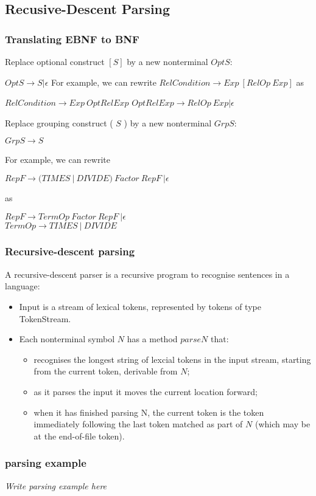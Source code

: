 \subsection{Recusive-Descent Parsing}
\subsubsection{Translating EBNF to BNF}

Replace optional construct $[S]$ by a new nonterminal $OptS$:

$OptS \rightarrow S | \epsilon$ \newline
For example, we can rewrite
$RelCondition \rightarrow Exp \ [RelOp \ Exp]$ \newline
as

$RelCondition \rightarrow Exp \ OptRelExp$
$OptRelExp \rightarrow RelOp \ Exp | \epsilon$

Replace grouping construct ( $S$ ) by a new nonterminal $GrpS$:

$GrpS \rightarrow S$

For example, we can rewrite

$RepF \rightarrow (TIMES \ | \ DIVIDE) \ Factor \ RepF \ | \epsilon$

as 

$RepF \rightarrow TermOp \ Factor \ RepF \ | \epsilon$ \\
$TermOp \rightarrow TIMES \ | \ DIVIDE$

\subsubsection{Recursive-descent parsing}
A recursive-descent parser is a recursive program to recognise sentences in a language:
\begin{itemize}
    \item Input is a stream of lexical tokens, represented by tokens of type TokenStream. 
    \item Each nonterminal symbol $N$ has a method $parseN$ that:
    \begin{itemize}
        \item recognises the longest string of lexcial tokens in the input stream, starting from the current token, derivable from $N$;
        \item as it parses the input it moves the current location forward;
        \item when it has finished parsing N, the current token is the token immediately following the last token matched as part of $N$ (which may be at the end-of-file token).
    \end{itemize}
\end{itemize}

\subsubsection{parsing example}
\emph{Write parsing example here}
\vspace*{7cm}